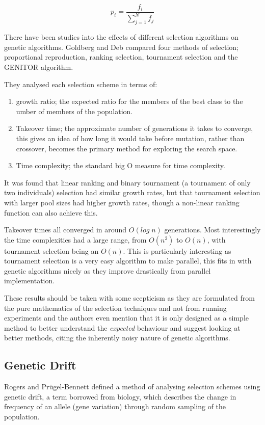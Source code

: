 \documentclass[10pt, a4paper]{article}
\begin{document}
\begin{equation}
p_i = \frac{f_i}{\sum^N_{j=1}f_j}
\label{eq:roulette}
\end{equation}

There have been studies into the effects of different selection algorithms on 
genetic algorithms. Goldberg and Deb\cite{Goldberg1991Comparative} compared
four methods of selection; proportional reproduction, ranking selection,
tournament selection and the GENITOR algorithm.%

They analysed each selection scheme in terms of:

\begin{enumerate}
\item growth ratio; the expected ratio for the members of the best class to the
umber of members of the population.
\item Takeover time; the approximate number of generations it takes
to converge, this gives an idea of how long it would take before mutation,
rather than crossover, becomes the primary method for exploring the search
space. 
\item Time complexity; the standard big O measure for time complexity.
\end{enumerate}

It was found that linear ranking and binary tournament (a tournament of only
two individuals) selection had similar growth rates, but that tournament 
selection with larger pool sizes had higher growth rates, though a non-linear
ranking function can also achieve this.

Takeover times all converged in around $O(log\;n)$ generations. Most 
interestingly the time complexities had a large range, from $O(n^2)$ to $O(n)$,
with tournament selection being an $O(n)$. This is particularly interesting as
tournament selection is a very easy algorithm to make parallel, this fits in
with genetic algorithms nicely as they improve drastically from parallel 
implementation.

These results should be taken with some scepticism as they are formulated from
the pure mathematics of the selection techniques and not from running 
experiments and the authors even mention that it is only designed as a simple 
method to better understand the \textit{expected} behaviour and suggest looking
at better methods, citing the inherently noisy nature of genetic algorithms.

\subsection{Genetic Drift}
Rogers and Pr\"{u}gel-Bennett\cite{Rogers1999Genetic} defined a method of 
analysing selection schemes using genetic drift, a term borrowed from biology,
which describes the change in frequency of an allele (gene variation) through
random sampling of the population.
\end{document}
